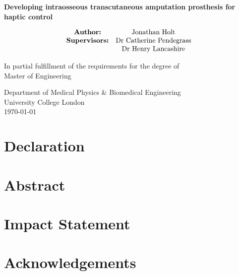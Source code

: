\begin{titlepage}
    \begin{center}
        \vspace*{1cm}
            
        \Huge
        \textbf{Developing intraosseous transcutaneous amputation prosthesis for haptic control}
            
        \vspace{0.5cm}
        \LARGE
            
        \vspace{1.5cm} \begin{align*}
            \begin{matrix}
                \text{\textbf{Author:}} & \text{Jonathan Holt} \\
                \textbf{Supervisors:} & \text{Dr Catherine Pendegrass} \\
                & \text{Dr Henry Lancashire}
            \end{matrix} \end{align*}

            
        \vfill
            
        In partial fulfillment of the requirements for the degree of \\
        Master of Engineering
            
        \vspace{0.8cm}
            
        \Large
        Department of Medical Physics \& Biomedical Engineering\\
        University College London\\
        \today \\
            
    \end{center}
\end{titlepage}

\section*{Declaration}
\section*{Abstract}
\section*{Impact Statement}
\section*{Acknowledgements}

\clearpage
\tableofcontents